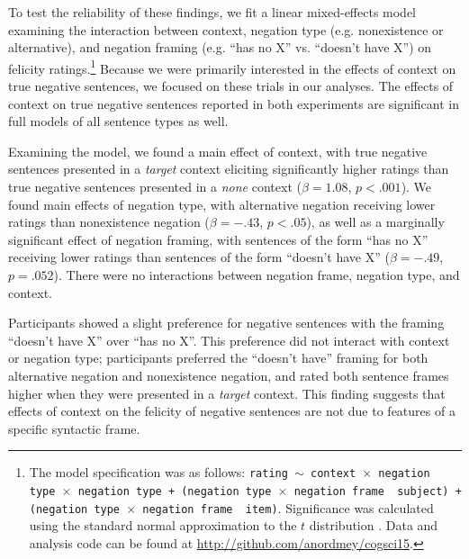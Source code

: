 \documentclass[10pt,letterpaper]{article}
\begin{document}
To test the reliability of these findings, we fit a linear mixed-effects model examining the interaction between context, negation type (e.g. nonexistence or alternative), and negation framing (e.g. ``has no X'' vs. ``doesn't have X'') on felicity ratings.\footnote{ The model specification was as follows: \texttt{rating $\sim$ context~$\times$~negation type~$\times$~negation type + (negation type~$\times$~negation frame~\textbar~subject) +  (negation type~$\times$~negation frame~\textbar~item)}.  Significance was calculated using the standard normal approximation to the $t$ distribution \cite{barr2013}. Data and analysis code can be found at \href{http://github.com/anordmey/cogsci15}{http://github.com/anordmey/cogsci15}.} Because we were primarily interested in the effects of context on true negative sentences, we focused on these trials in our analyses.  The effects of context on true negative sentences reported in both experiments are significant in full models of all sentence types as well.

Examining the model, we found a main effect of context, with true negative sentences presented in a \emph{target} context eliciting significantly higher ratings than true negative sentences presented in a \emph{none} context ($\beta= 1.08$, $p< .001$).  We found main effects of negation type, with alternative negation receiving lower ratings than nonexistence negation ($\beta= -.43$, $p< .05$), as well as a marginally significant effect of negation framing, with sentences of the form ``has no X'' receiving lower ratings than sentences of the form ``doesn't have X''  ($\beta= -.49$, $p= .052$).  There were no interactions between negation frame, negation type, and context.  

Participants showed a slight preference for negative sentences with the framing ``doesn't have X'' over ``has no X''.  This preference did not interact with context or negation type; participants preferred the ``doesn't have'' framing for both alternative negation and nonexistence negation, and rated both sentence frames higher when they were presented in a \emph{target} context.  This finding suggests that effects of context on the felicity of negative sentences are not due to features of a specific syntactic frame.
\end{document}
